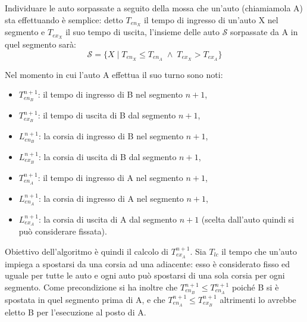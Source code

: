 Individuare le auto sorpassate a seguito della mossa che un'auto (chiamiamola A) sta effettuando è semplice: detto $T_{en_X}$ il tempo di ingresso di un'auto X nel segmento e $T_{ex_X}$ il suo tempo di uscita, l'insieme delle auto $\mathcal{S}$ sorpassate da A in quel segmento sarà:
\[ \mathcal{S} = \{ X \mid T_{en_X} \leq T_{en_A} \;\wedge\; T_{ex_X} > T_{ex_A}\} \]

Nel momento in cui l'auto A effettua il suo turno sono noti:
\begin{itemize}
\item $T_{en_B}^{n+1}$: il tempo di ingresso di B nel segmento $n+1$,
\item $T_{ex_B}^{n+1}$: il tempo di uscita di B dal segmento $n+1$,
\item $L_{en_B}^{n+1}$: la corsia di ingresso di B nel segmento $n+1$,
\item $L_{ex_B}^{n+1}$: la corsia di uscita di B dal segmento $n+1$,
\item $T_{en_A}^{n+1}$: il tempo di ingresso di A nel segmento $n+1$,
\item $L_{en_A}^{n+1}$: la corsia di ingresso di A nel segmento $n+1$,
\item $L_{ex_A}^{n+1}$: la corsia di uscita di A dal segmento $n+1$ (scelta dall'auto quindi si può considerare fissata).
\end{itemize}
Obiettivo dell'algoritmo è quindi il calcolo di $T_{ex_A}^{n+1}$. Sia $T_{lc}$ il tempo che un'auto impiega a spostarsi da una corsia ad una adiacente: esso è considerato fisso ed uguale per tutte le auto e ogni auto può spostarsi di una sola corsia per ogni segmento.
Come precondizione si ha inoltre che $T_{en_B}^{n+1} \leq T_{en_A}^{n+1}$ poiché B si è spostata in quel segmento prima di A, e che $T_{en_A}^{n+1} \leq T_{ex_B}^{n+1}$ altrimenti lo \sched{} avrebbe eletto B per l'esecuzione al posto di A.

